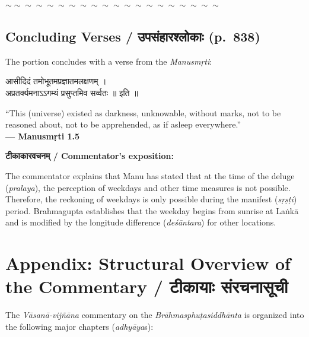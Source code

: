 \documentclass[11pt,a4paper]{article}
\newcommand{\dev}[1]{{\devanagarifont #1}}
\newenvironment{bilingualverse}{%
  \begin{paracol}{2}
  \fontsize{10.5}{13}\selectfont
}{%
  \end{paracol}
  \vspace{0.3cm}
}
\newcommand{\wavydivider}{\begin{center}$\sim\sim\sim\sim\sim\sim\sim\sim\sim\sim\sim\sim\sim\sim\sim\sim\sim\sim\sim\sim$\end{center}}
\newenvironment{paracol}[1]{\begingroup}{\endgroup}
\newenvironment{leftcolumn*}{\begingroup}{\endgroup}
\newenvironment{rightcolumn}{\begingroup}{\endgroup}
\begin{document}
\begin{paracol}{2}
\wavydivider

\subsection*{Concluding Verses / \dev{उपसंहारश्लोकाः} (p.\ 838)}

The portion concludes with a verse from the \textit{Manusmṛti}:

\begin{bilingualverse}
\begin{leftcolumn*}
\dev{आसीदिदं तमोभूतमप्रज्ञातमलक्षणम् ।}\\
\dev{अप्रतर्क्यमनाऽऽगम्यं प्रसुप्तमिव सर्व्वतः ॥ इति ॥}
\end{leftcolumn*}
\begin{rightcolumn}
``This (universe) existed as darkness, unknowable, without marks, not to be reasoned about, not to be apprehended, as if asleep everywhere.''\\[0.3cm]
\hfill\textbf{— Manusmṛti 1.5}
\end{rightcolumn}
\end{bilingualverse}

\textbf{\dev{टीकाकारवचनम्} / Commentator's exposition:}

The commentator explains that Manu has stated that at the time of the deluge (\textit{pralaya}), the perception of weekdays and other time measures is not possible. Therefore, the reckoning of weekdays is only possible during the manifest (\textit{sṛṣṭi}) period. Brahmagupta establishes that the weekday begins from sunrise at Laṅkā and is modified by the longitude difference (\textit{deśāntara}) for other locations.

\newpage

\section*{Appendix: Structural Overview of the Commentary / \dev{टीकायाः संरचनासूची}}

The \textit{Vāsanā-vijñāna} commentary on the \textit{Brāhmasphuṭasiddhānta} is organized into the following major chapters (\textit{adhyāya}s):


\end{paracol}
\end{document}
